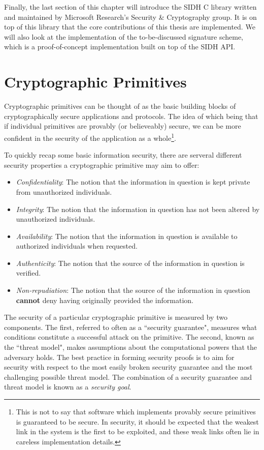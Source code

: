 Finally, the last section of this chapter will introduce the SIDH C library written and maintained by Microsoft Research's Security \& Cryptography group. It is on top of this library that the core contributions of this thesis are implemented. We will also look at the implementation of the to-be-discussed signature scheme, which is a proof-of-concept implementation built on top of the SIDH API.\\


\section{Cryptographic Primitives}
\label{sec:crypto}

Cryptographic primitives can be thought of as the basic building blocks of cryptographically secure applications and protocols. The idea of which being that if individual primitives are provably (or believeably) secure, we can be more confident in the security of the application as a whole\footnote{This is not to say that software which implements provably secure primitives is guaranteed to be secure. In security, it should be expected that the weakest link in the system is the first to be exploited, and these weak links often lie in careless implementation details.}.

To quickly recap some basic information security, there are serveral different security properties a cryptographic primitive may aim to offer:
\begin{itemize}
\item \emph{Confidentiality}:
The notion that the information in question is kept private from unauthorized individuals.
\item \emph{Integrity}:
The notion that the information in question has not been altered by unauthorized individuals.
\item \emph{Availability}:
The notion that the information in question is available to authorized individuals when requested.
\item \emph{Authenticity}:
The notion that the source of the information in question is verified.
\item \emph{Non-repudiation}:
The notion that the source of the information in question \textbf{cannot} deny having originally provided the information.
\end{itemize}

The security of a particular cryptographic primitive is measured by two components. The first, referred to often as a ``security guarantee", measures what conditions constitute a successful attack on the primitive. The second, known as the ``threat model", makes assumptions about the computational powers that the adversary holds. The best practice in forming security proofs is to aim for security with respect to the most easily broken security guarantee and the most challenging possible threat model. The combination of a security guarantee and threat model is known as a \emph{security goal}.

